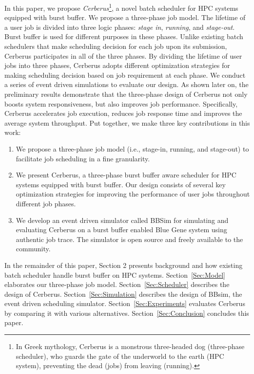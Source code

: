 In this paper, we propose \textit{Cerberus}\footnote{In Greek mythology,
Cerberus is a monstrous three-headed dog (three-phase scheduler),
who guards the gate of the underworld to the earth (HPC system),
preventing the dead (jobs) from leaving (running).},
a novel batch scheduler for HPC systems equipped with burst buffer. 
We propose a three-phase job model.
The lifetime of a user job is divided into three logic phases:
\textit{stage in}, \textit{running}, and \textit{stage-out}.
Burst buffer is used for different purposes in these phases.
Unlike existing batch schedulers that make scheduling decision for each job upon its submission,
Cerberus participates in all of the three phases.
By dividing the lifetime of user jobs into three phases,
Cerberus adopts different optimization strategies for 
making scheduling decision based on job requirement at each phase.
We conduct a series of event driven simulations to evaluate our design. 
As shown later on,
the preliminary results demonstrate that the three-phase design of Cerberus 
not only boosts system responsiveness, but also improves job performance. 
Specifically,
Cerberus accelerates job execution, reduces job response time 
and improves the average system throughput.
Put together, we make three key contributions in this work:
\begin{enumerate}
        \item    We propose a three-phase job model (i.e., stage-in, running, and stage-out)
                to facilitate job scheduling in a fine granularity.
        \item    We present Cerberus, a three-phase burst buffer aware scheduler
                for HPC systems equipped with burst buffer.
                Our design consists of several key optimization strategies for
                improving the performance of user jobs throughout different job phases.
        \item    We develop an event driven simulator called BBSim
                for simulating and evaluating Cerberus on a burst buffer enabled Blue Gene system
                using authentic job trace. The simulator is open source and
                freely available to the community.
\end{enumerate}


In the remainder of this paper, Section 2 presents background and 
how existing batch scheduler handle burst buffer on HPC systems.
Section~\ref{Sec:Model} elaborates our three-phase job model.
Section~\ref{Sec:Scheduler} describes the design of Cerberus.
Section~\ref{Sec:Simulation} describes the design of BBsim, the event driven scheduling simulator.
Section~\ref{Sec:Experiments} evaluates Cerberus by comparing it with various alternatives.
Section~\ref{Sec:Conclusion} concludes this paper.

